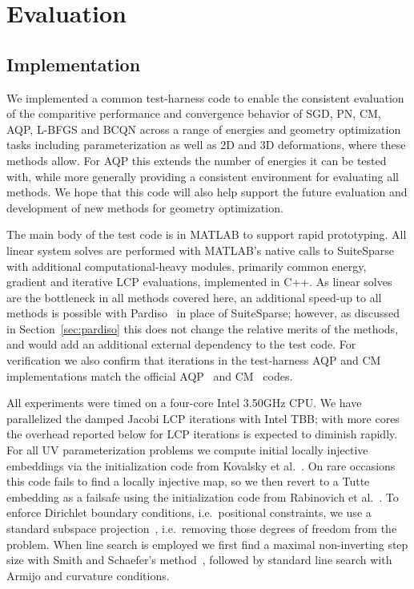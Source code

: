 \section{Evaluation}
\label{sec:results}

\subsection{Implementation}

We implemented a common test-harness code to enable the consistent
evaluation of the comparitive performance and convergence behavior
of SGD, PN, CM, AQP, L-BFGS and BCQN across a range of energies and
geometry optimization tasks including parameterization as well as
2D and 3D deformations, where these methods allow. For AQP this extends
the number of energies it can be tested with, while more generally
providing a consistent environment for evaluating all methods. We
hope that this code will also help support the future evaluation
and development of new methods for geometry optimization.

The main body of the test code is in MATLAB to support rapid
prototyping.  All linear system solves are performed with MATLAB's
native calls to SuiteSparse~\cite{Chen:2008:ACS} with additional
computational-heavy modules, primarily common energy, gradient and
iterative LCP evaluations, implemented in C++.  As linear solves
are the bottleneck in all methods covered here, an additional
speed-up to all methods is possible with
Pardiso~\cite{Petra:2014:AAI,Petra:2014:RTS} in place of SuiteSparse;
however, as discussed in Section~\ref{sec:pardiso} this does not change
the relative merits of the methods, and would add an additional external
dependency to the test code. For verification we also confirm that
iterations in the test-harness AQP and CM implementations match the
official AQP~\cite{Kovalsky:2016:AQP} and CM~\cite{Shtengel:2017:GOV}
codes.

All experiments were timed on a four-core Intel
3.50GHz CPU. We have parallelized the damped Jacobi LCP iterations
with Intel TBB; with more cores the overhead reported below for LCP
iterations is expected to diminish rapidly.
For all UV parameterization problems we compute 
initial locally injective embeddings via the initialization code
from Kovalsky et al.~. On rare occasions
this code fails to find a locally injective map, so we
then revert to a Tutte embedding as a failsafe using the initialization
code from Rabinovich et al.~. To
enforce Dirichlet boundary conditions, i.e.\ positional constraints,
we use a standard subspace projection~\cite{Nocedal:2006:Book}, i.e.\
removing those degrees of freedom from the problem.
When line search is employed we first find a
maximal non-inverting step size with Smith and
Schaefer's method~, followed by standard
line search with Armijo and curvature conditions.

